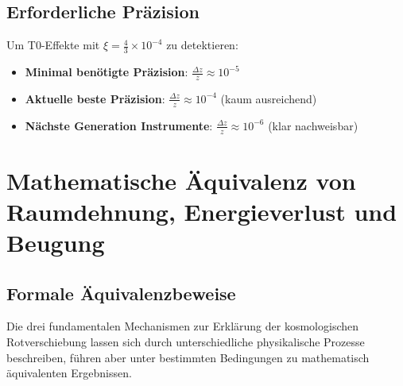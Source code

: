 \documentclass[12pt,a4paper]{article}
\newcommand{\xiconst}{\xi = \frac{4}{3} \times 10^{-4}}
\theoremstyle{definition}
\begin{document}
	\subsection{Erforderliche Pr\"azision}
	
	Um T0-Effekte mit $\xiconst$ zu detektieren:
	\begin{itemize}
		\item \textbf{Minimal ben\"otigte Pr\"azision}: $\frac{\Delta z}{z} \approx 10^{-5}$
		\item \textbf{Aktuelle beste Pr\"azision}: $\frac{\Delta z}{z} \approx 10^{-4}$ (kaum ausreichend)
		\item \textbf{N\"achste Generation Instrumente}: $\frac{\Delta z}{z} \approx 10^{-6}$ (klar nachweisbar)
	\end{itemize}
\section{Mathematische Äquivalenz von Raumdehnung, Energieverlust und Beugung}
\label{sec:equivalence}

\subsection{Formale Äquivalenzbeweise}
\label{subsec:equivalence_proofs}

Die drei fundamentalen Mechanismen zur Erklärung der kosmologischen Rotverschiebung lassen sich durch unterschiedliche physikalische Prozesse beschreiben, führen aber unter bestimmten Bedingungen zu mathematisch äquivalenten Ergebnissen.

\begin{table}[h]
	\centering
	\caption{Vergleich der Rotverschiebungsmechanismen mit erweiterten Entwicklungen}
\end{table}
\end{document}
